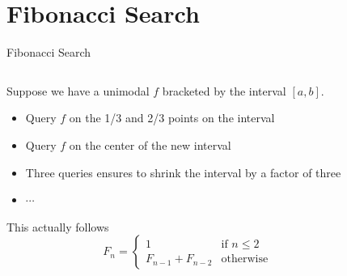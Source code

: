 \documentclass{beamer}
\begin{document}
\section{Fibonacci Search}
\begin{frame}{Fibonacci Search}
\begin{columns}
\begin{column}{.6\textwidth}
Suppose we have a unimodal $f$ bracketed by the interval $[a, b]$.
\begin{itemize}
    \item Query $f$ on the 1/3 and 2/3 points on the interval
    \item Query $f$ on the center of the new interval
    \item Three queries ensures to shrink the interval by a factor of three
    \item $\cdots$
\end{itemize}
   
This actually follows %
\begin{equation*}
F_n = 
    \begin{cases}
    1 & \textrm{if~} n\leq 2\\
    F_{n-1} + F_{n-2} & \textrm{otherwise}
    \end{cases}
\end{equation*}

\end{column}

\begin{column}{.4\textwidth}
\end{column}

\end{columns}

\end{frame}
\end{document}
